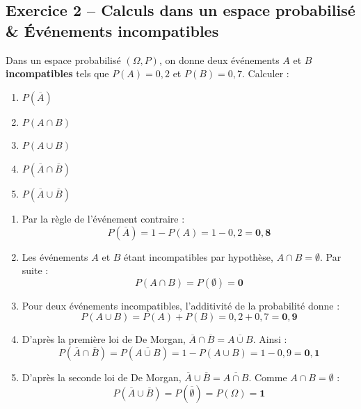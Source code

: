 \documentclass[11pt,a4paper]{article}
\begin{document}
\vspace{0.3cm}

\subsection*{Exercice 2 -- Calculs dans un espace probabilisé \& Événements incompatibles}

Dans un espace probabilisé $(\Omega, P)$, on donne deux événements $A$ et $B$ \textbf{incompatibles} tels que $P(A) = 0{,}2$ et $P(B) = 0{,}7$. Calculer :
\begin{enumerate}[label=\arabic*.]
    \item $P(\overline{A})$
    \item $P(A \cap B)$
    \item $P(A \cup B)$
    \item $P(\overline{A} \cap \overline{B})$
    \item $P(\overline{A} \cup \overline{B})$
\end{enumerate}

\begin{correctionbox}
\begin{enumerate}[label=\arabic*.]
    \item Par la règle de l'événement contraire :
    \[
    P(\overline{A}) = 1 - P(A) = 1 - 0{,}2 = \mathbf{0{,}8}
    \]
    \item Les événements $A$ et $B$ étant incompatibles par hypothèse, $A \cap B = \emptyset$. Par suite :
    \[
    P(A \cap B) = P(\emptyset) = \mathbf{0}
    \]
    \item Pour deux événements incompatibles, l'additivité de la probabilité donne :
    \[
    P(A \cup B) = P(A) + P(B) = 0{,}2 + 0{,}7 = \mathbf{0{,}9}
    \]
    \item D'après la première loi de De Morgan, $\overline{A} \cap \overline{B} = \overline{A \cup B}$. Ainsi :
    \[
    P(\overline{A} \cap \overline{B}) = P(\overline{A \cup B}) = 1 - P(A \cup B) = 1 - 0{,}9 = \mathbf{0{,}1}
    \]
    \item D'après la seconde loi de De Morgan, $\overline{A} \cup \overline{B} = \overline{A \cap B}$. Comme $A \cap B = \emptyset$ :
    \[
    P(\overline{A} \cup \overline{B}) = P(\overline{\emptyset}) = P(\Omega) = \mathbf{1}
    \]
\end{enumerate}
\end{correctionbox}
\end{document}
